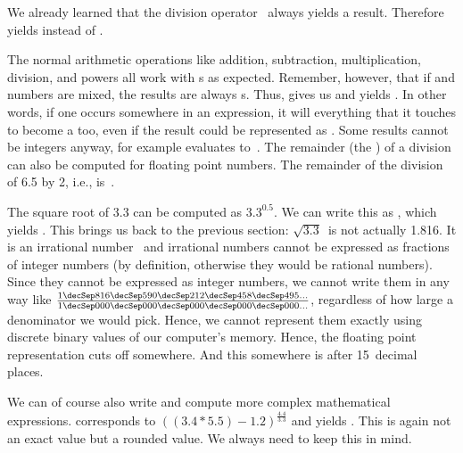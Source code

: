 We already learned that the division operator~\pythonilIdx{/} always yields a  result.
Therefore  yields  instead of .

The normal arithmetic operations like addition, subtraction, multiplication, division, and powers all work with s as expected.
Remember, however, that if  and  numbers are mixed, the results are always s.
Thus, \pythonIdx{+} gives us  and \pythonIdx{*} yields .
In other words, if one  occurs somewhere in an expression, it will  everything that it touches to become a  too, even if the result could be represented as .
Some results cannot be integers anyway, for example \pythonIdx{-} evaluates to~.
The remainder (the ) of a division can also be computed for floating point numbers.
The remainder of the division of 6.5 by 2, i.e., \expandafter{}\pythonIdx{\%} is~.%
%
\begin{sloppypar}%
The square root of 3.3 can be computed as $3.3^{0.5}$.
We can write this as \pythonIdx{**}, which yields .
This brings us back to the previous section:
$\sqrt{3.3}$~is not actually 1.816.
It is an irrational number~\cite{S1988WPCHD,B1991IWNT} and irrational numbers cannot be expressed as fractions of integer numbers (by definition, otherwise they would be rational numbers).
Since they cannot be expressed as integer numbers, we cannot write them in any way like $\frac{1\decSep816\decSep590\decSep212\decSep458\decSep495\dots}{1\decSep000\decSep000\decSep000\decSep000\decSep000\dots}$, regardless of how large a denominator we would pick.
Hence, we cannot represent them exactly using discrete binary values of our computer's memory.
Hence, the floating point representation cuts off somewhere.
And this somewhere is after 15~decimal places.%
\end{sloppypar}%
%
\begin{sloppypar}%
We can of course also write and compute more complex mathematical expressions.
\pythonIdx{(}\pythonIdx{)} corresponds to $((3.4*5.5)-1.2)^{\frac{4.4}{3.3}}$ and yields .
This is again not an exact value but a rounded value.
We always need to keep this in mind.%
\end{sloppypar}%
